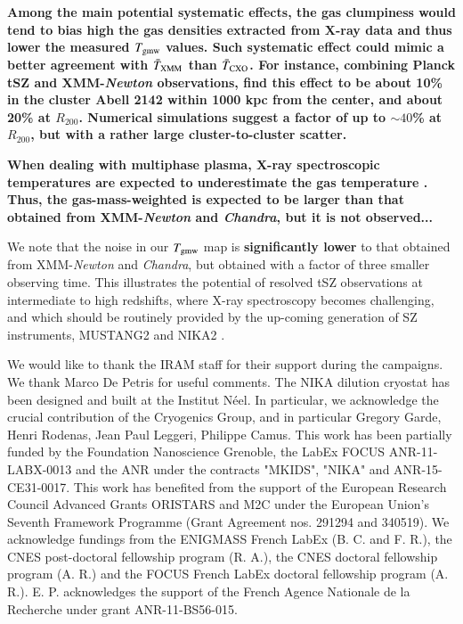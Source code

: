 \documentclass[twocolumn,traditabstract]{aa}
\begin{document}
{\bf Among the main potential systematic effects, the gas clumpiness would tend to bias high the gas densities extracted from X-ray data and thus lower the measured $T_{\rm gmw}$ values. Such systematic effect could mimic a better agreement with $\bar{T}_{\rm XMM}$ than $\bar{T}_{\rm CXO}$. For instance, combining Planck tSZ \citep{Planck2015I} and XMM-\textit{Newton} observations, \citep{Tchernin2016} find this effect to be about 10\% in the cluster Abell 2142 within 1000 kpc from the center, and about 20\% at $R_{200}$. Numerical simulations \citep[e.g.,][]{Nagai2011,Zhuravleva2013,Vazza2013} suggest a factor of up to $\sim 40$\% at $R_{200}$, but with a rather large cluster-to-cluster scatter.}

{\bf When dealing with multiphase plasma, X-ray spectroscopic temperatures are expected to underestimate the gas temperature \citep{maz04}. Thus, the gas-mass-weighted is expected to be larger than that obtained from XMM-\textit{Newton} and \textit{Chandra}, but it is not observed...}

We note that the noise in our $T_{\rm gmw}$ map is {\bf significantly lower} to that obtained from XMM-\textit{Newton} and \textit{Chandra}, but obtained with a factor of three smaller observing time. This illustrates the potential of resolved tSZ observations at intermediate to high redshifts, where X-ray spectroscopy becomes challenging, and which should be routinely provided by the up-coming generation of SZ instruments, MUSTANG2 \citep{Dicker2014} and NIKA2 \citep{Calvo2016,Comis2016}.

\begin{acknowledgements}
We would like to thank the IRAM staff for their support during the campaigns. 
We thank Marco De Petris for useful comments.
The NIKA dilution cryostat has been designed and built at the Institut N\'eel. In particular, we acknowledge the crucial contribution of the Cryogenics Group, and  in particular Gregory Garde, Henri Rodenas, Jean Paul Leggeri, Philippe Camus. 
This work has been partially funded by the Foundation Nanoscience Grenoble, the LabEx FOCUS ANR-11-LABX-0013 and the ANR under the contracts "MKIDS", "NIKA" and ANR-15-CE31-0017. 
This work has benefited from the support of the European Research Council Advanced Grants ORISTARS and M2C under the European Union's Seventh Framework Programme (Grant Agreement nos. 291294 and 340519).
We acknowledge fundings from the ENIGMASS French LabEx (B. C. and F. R.), the CNES post-doctoral fellowship program (R. A.),  the CNES doctoral fellowship program (A. R.) and the FOCUS French LabEx doctoral fellowship program (A. R.).
E. P. acknowledges the support of the French Agence Nationale de la Recherche under grant ANR-11-BS56-015.
\end{acknowledgements}


\end{document}
